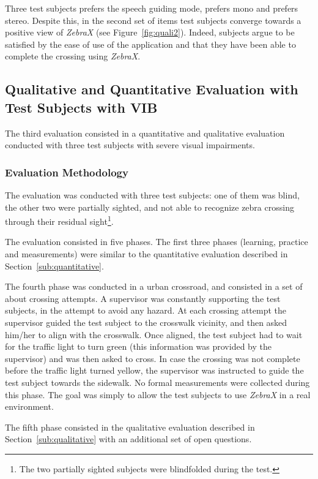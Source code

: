 \documentclass{article}
\newcommand{\zebra}{\emph{ZebraX}}
\begin{document}
Three test subjects prefers the speech guiding mode,  prefers mono and  prefers stereo.
Despite this, in the second set of items test subjects converge towards a positive view of \zebra{} (see Figure~\ref{fig:quali2}).
Indeed, subjects argue to be satisfied by the ease of use of the application and that they have been able to complete the crossing using \zebra{}.

\subsection{Qualitative and Quantitative Evaluation with Test Subjects with VIB}
\label{sub:quantiquali}
The third evaluation consisted in a quantitative and qualitative evaluation conducted with three test subjects with severe visual impairments.

\subsubsection{Evaluation Methodology}
The evaluation was conducted with three test subjects: one of them was blind, the other two were partially sighted, and not able to recognize zebra crossing through their residual sight\footnote{The two partially sighted subjects were blindfolded during the test.}.

The evaluation consisted in five phases. The first three phases (learning, practice and measurements) were similar to the quantitative evaluation described in Section~\ref{sub:quantitative}.

The fourth phase was conducted in a urban crossroad, and consisted in a set of about  crossing attempts. A supervisor was constantly supporting the test subjects, in the attempt to avoid any hazard. At each crossing attempt the supervisor guided the test subject to the crosswalk vicinity, and then asked him/her to align with the crosswalk. Once aligned, the test subject had to wait for the traffic light to turn green (this information was provided by the supervisor) and was then asked to cross. In case the crossing was not complete before the traffic light turned yellow, the supervisor was instructed to guide the test subject towards the sidewalk. No formal measurements were collected during this phase. The goal was simply to allow the test subjects to use \zebra{} in a real environment.

The fifth phase consisted in the qualitative evaluation described in Section~\ref{sub:qualitative} with an additional set of open questions.
\end{document}
